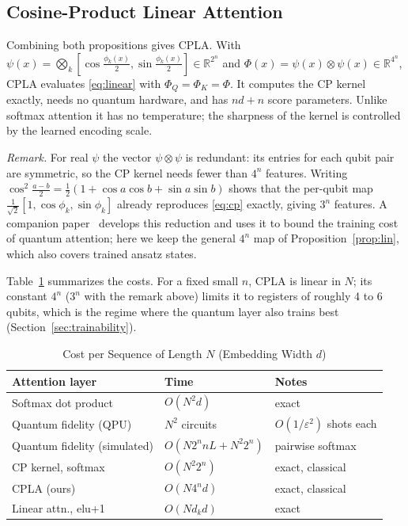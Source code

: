 \documentclass[conference]{IEEEtran}
\newcommand{\cpla}{CPLA}
\begin{document}
\subsection{Cosine-Product Linear Attention}
Combining both propositions gives \cpla. With $\psi(x)=\bigotimes_k[\cos\frac{\phi_k(x)}{2},\sin\frac{\phi_k(x)}{2}]\in\mathbb{R}^{2^n}$ and $\Phi(x)=\psi(x)\otimes\psi(x)\in\mathbb{R}^{4^n}$, \cpla{} evaluates \eqref{eq:linear} with $\Phi_Q=\Phi_K=\Phi$. It computes the CP kernel exactly, needs no quantum hardware, and has $nd+n$ score parameters. Unlike softmax attention it has no temperature; the sharpness of the kernel is controlled by the learned encoding scale.

\textit{Remark.} For real $\psi$ the vector $\psi\otimes\psi$ is redundant: its entries for each qubit pair are symmetric, so the CP kernel needs fewer than $4^n$ features. Writing $\cos^2\frac{a-b}{2}=\frac12(1+\cos a\cos b+\sin a\sin b)$ shows that the per-qubit map $\frac{1}{\sqrt2}[1,\cos\phi_k,\sin\phi_k]$ already reproduces \eqref{eq:cp} exactly, giving $3^n$ features. A companion paper~\cite{singuru2026cost} develops this reduction and uses it to bound the training cost of quantum attention; here we keep the general $4^n$ map of Proposition~\ref{prop:lin}, which also covers trained ansatz states.

Table~\ref{tab:cost} summarizes the costs. For a fixed small $n$, \cpla{} is linear in $N$; its constant $4^n$ ($3^n$ with the remark above) limits it to registers of roughly 4 to 6 qubits, which is the regime where the quantum layer also trains best (Section~\ref{sec:trainability}).

\begin{table}[t]
\caption{Cost per Sequence of Length $N$ (Embedding Width $d$)}
\label{tab:cost}
\centering
\setlength{\tabcolsep}{3pt}
\begin{tabular}{@{}lll@{}}
\toprule
Attention layer & Time & Notes \\
\midrule
Softmax dot product & $O(N^2 d)$ & exact \\
Quantum fidelity (QPU) & $N^2$ circuits & $O(1/\varepsilon^2)$ shots each \\
Quantum fidelity (simulated) & $O(N 2^n nL + N^2 2^n)$ & pairwise softmax \\
CP kernel, softmax & $O(N^2 2^n)$ & exact, classical \\
\cpla{} (ours) & $O(N 4^n d)$ & exact, classical \\
Linear attn., elu+1~\cite{katharopoulos2020linear} & $O(N d_k d)$ & exact \\
\bottomrule
\end{tabular}
\end{table}
\end{document}
